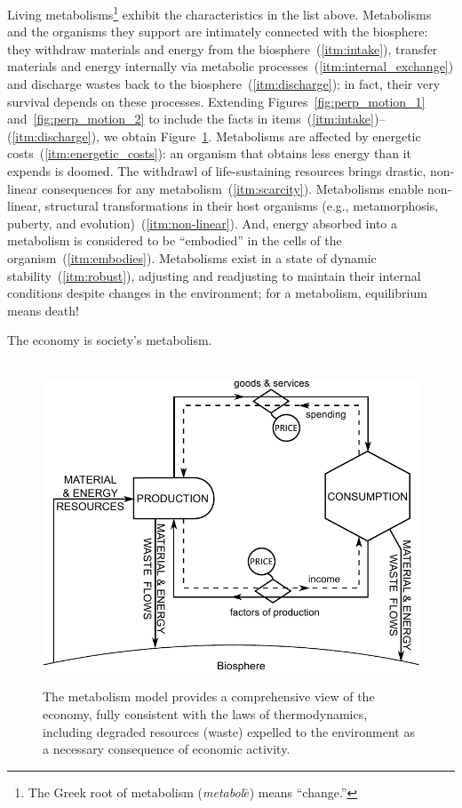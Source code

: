 Living metabolisms\footnote{The 
	Greek root of metabolism 
	(\emph{metabol$\bar{e}$}) means ``change.''}
exhibit the characteristics in the list above.
Metabolisms and the organisms they support
are intimately connected with the biosphere:
they withdraw materials and energy from the biosphere~(\ref{itm:intake}), 
transfer materials and energy internally via metabolic processes~(\ref{itm:internal_exchange})
and discharge wastes back to the biosphere~(\ref{itm:discharge});
in fact, their very survival depends on these processes.
Extending Figures~\ref{fig:perp_motion_1} and~\ref{fig:perp_motion_2}
to include the facts in items~(\ref{itm:intake})--(\ref{itm:discharge}), 
we obtain Figure~\ref{fig:metabolic_economy}.
Metabolisms are affected by energetic costs~(\ref{itm:energetic_costs}): 
an organism that obtains less energy than it expends is doomed.
The withdrawl of life-sustaining resources brings drastic, non-linear
consequences for any metabolism~(\ref{itm:scarcity}).
Metabolisms enable non-linear, structural transformations
in their host organisms (e.g., metamorphosis, puberty, and evolution)~(\ref{itm:non-linear}).
And, energy absorbed into a metabolism is considered to be ``embodied''
in the cells of the organism~(\ref{itm:embodies}).
Metabolisms exist in a state of dynamic stability~(\ref{itm:robust}),
adjusting and readjusting to maintain their internal conditions
despite changes in the environment;
for a metabolism, equilibrium means death!

The economy is society's metabolism.\cite{F-K1998, Giampietro2000, Giampietro2013}

\begin{figure}[!ht]
\centering\
\includegraphics[width=\linewidth]{Part_0/Chapter_Introduction/images/PERKS.pdf}
\caption[The metabolism model]{The metabolism model provides a comprehensive view 
of the economy, fully consistent with the laws of thermodynamics, 
including degraded resources (waste) expelled 
to the environment as a necessary consequence of economic activity.}
\label{fig:metabolic_economy}
\end{figure}


